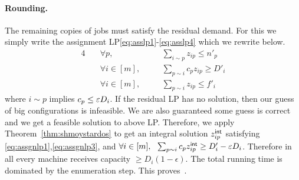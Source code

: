 \paragraph{Rounding.}
The remaining copies of jobs must satisfy the residual demand. For this we simply write the assignment LP\eqref{eq:asslp1}-\eqref{eq:asslp4} which we rewrite below.
\begin{alignat}{4}
	& \quad \forall p,   &&\quad  \textstyle \sum_{i\sim p} z_{ip} \leq n'_p \label{eq:assgnlp1} \\
	& \quad \forall i\in [m] ,  &&\quad  \textstyle \sum_{p\sim i} c_pz_{ip}  \geq D'_i \label{eq:assgnlp2}\\
	& \quad \forall i\in [m], && \quad \textstyle \sum_{p\sim i} z_{ip}  \leq  f'_i \label{eq:assgnlp3}
\end{alignat}
where $i\sim p$ implies $c_p\leq \varepsilon D_i$. If the residual LP has no solution, then our guess of big configurations is infeasible.
We are also guaranteed some guess is correct and we get a feasible solution to above LP. 
Therefore, we apply Theorem~\ref{thm:shmoystardos} to get an integral solution $z^{\mathsf{int}}_{ip}$ satisfying \eqref{eq:assgnlp1},\eqref{eq:assgnlp3},
and $\forall i\in [m], ~~ \sum_{p\sim i} c_pz^{\mathsf{int}}_{ip}  \geq D'_i - \varepsilon D_i$.
Therefore in all every machine receives capacity $\geq D_i(1-\epsilon)$. The total running time is dominated by the enumeration step.
This proves~.
%
%
